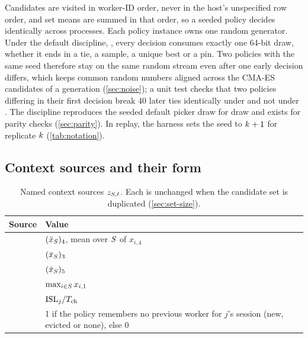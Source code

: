 Candidates are visited in worker-ID order, never in the host's unspecified row order, and set
means are summed in that order, so a seeded policy decides identically across processes. Each
policy instance owns one random generator. Under the default discipline, , every
decision consumes exactly one 64-bit draw, whether it ends in a tie, a sample, a unique best or a
pin. Two policies with the same seed therefore stay on the same random stream even after one early
decision differs, which keeps common random numbers aligned across the CMA-ES candidates of a
generation (\cref{sec:noise}); a unit test checks that two policies differing in their first
decision break 40 later ties identically under  and not under .
The  discipline reproduces the seeded default picker draw for draw and exists for
parity checks (\cref{sec:parity}). In replay, the harness sets the seed to $k + 1$ for
replicate $k$ (\cref{tab:notation}).

\subsection{Context sources and their form}

\begin{table}[tbp]
  \centering\small
  \caption{Named context sources $\ctxv_{\cand,\cidx}$. Each is unchanged when the candidate set
    is duplicated (\cref{sec:set-size}).}
  \label{tab:sources}
  \begin{tabularx}{\linewidth}{@{}lY@{}}
    \toprule
    Source & Value \\
    \midrule
                & $(\bar{x}_{S})_4$, mean over $S$ of $x_{i,4}$ \\
     & $(\bar{x}_{S})_3$ \\
           & $(\bar{x}_{S})_5$ \\
                  & $\max_{i \in S} x_{i,1}$ \\
                              & $\mathrm{ISL}_j / T_{\mathrm{ch}}$ \\
                     & 1 if the policy remembers no previous worker for $j$'s
      session (new, evicted or none), else 0 \\
    \bottomrule
  \end{tabularx}
\end{table}


